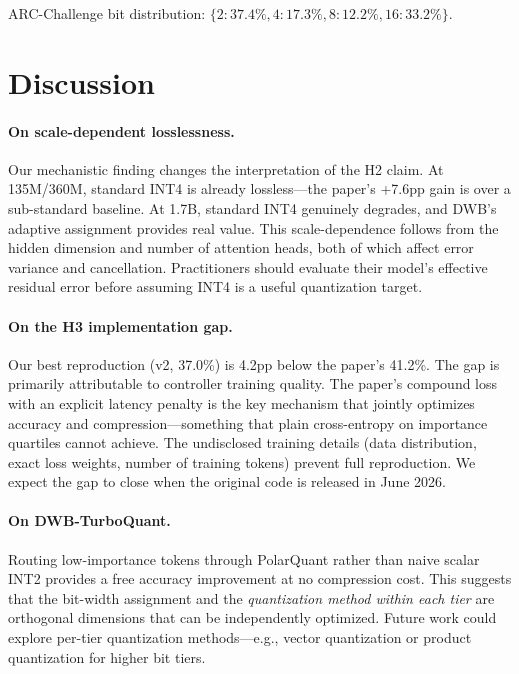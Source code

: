 \documentclass[10pt,twocolumn]{article}
\begin{document}
ARC-Challenge bit distribution: $\{2: 37.4\%, 4: 17.3\%, 8: 12.2\%, 16: 33.2\%\}$.

\section{Discussion}
\label{sec:discussion}

\paragraph{On scale-dependent losslessness.}
Our mechanistic finding changes the interpretation of the H2 claim.
At 135M/360M, standard INT4 is already lossless—the paper's +7.6pp gain
is over a sub-standard baseline.
At 1.7B, standard INT4 genuinely degrades, and DWB's adaptive assignment
provides real value.
This scale-dependence follows from the hidden dimension and number of
attention heads, both of which affect error variance and cancellation.
Practitioners should evaluate their model's effective residual error
before assuming INT4 is a useful quantization target.

\paragraph{On the H3 implementation gap.}
Our best reproduction (v2, 37.0\%) is 4.2pp below the paper's 41.2\%.
The gap is primarily attributable to controller training quality.
The paper's compound loss with an explicit latency penalty is the key
mechanism that jointly optimizes accuracy and compression—something that
plain cross-entropy on importance quartiles cannot achieve.
The undisclosed training details (data distribution, exact loss weights,
number of training tokens) prevent full reproduction.
We expect the gap to close when the original code is released in June 2026.

\paragraph{On DWB-TurboQuant.}
Routing low-importance tokens through PolarQuant rather than naive scalar
INT2 provides a free accuracy improvement at no compression cost.
This suggests that the bit-width assignment and the \emph{quantization
method within each tier} are orthogonal dimensions that can be
independently optimized.
Future work could explore per-tier quantization methods—e.g., vector
quantization \cite{hooper2024kvquant} or product quantization for higher
bit tiers.
\end{document}
